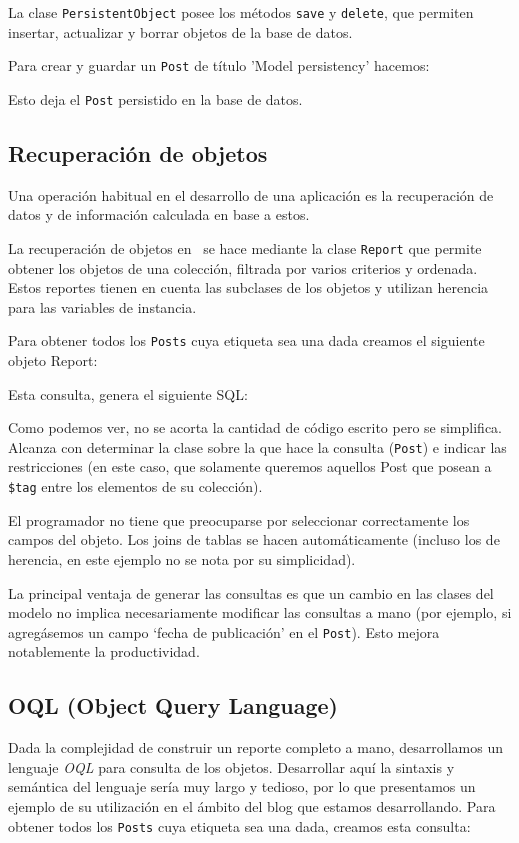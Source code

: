 La clase \verb'PersistentObject' posee los métodos \verb'save' y \verb'delete', que permiten insertar, actualizar y borrar objetos de la base de datos.

Para crear y guardar un \verb'Post' de título 'Model persistency' hacemos:


Esto deja el \verb'Post' persistido en la base de datos.

\subsection{Recuperación de objetos}

Una operación habitual en el desarrollo de una aplicación es la recuperación de datos y de información calculada en base a estos.

La recuperación de objetos en \PWB \ se hace mediante la clase \verb"Report" que permite obtener los objetos de una colección, filtrada por varios criterios y ordenada. Estos reportes tienen en cuenta las subclases de los objetos y utilizan herencia para las variables de instancia.

Para obtener todos los \verb"Posts" cuya etiqueta sea una dada creamos el siguiente objeto Report:


Esta consulta, genera el siguiente SQL:


Como podemos ver, no se acorta la cantidad de código escrito pero se simplifica. Alcanza con determinar la clase sobre la que hace la consulta (\verb"Post") e indicar las restricciones (en este caso, que solamente queremos aquellos Post que posean a \verb'$tag' entre los elementos de su colección). %

El programador no tiene que preocuparse por seleccionar correctamente los campos del objeto. Los joins de tablas se hacen automáticamente (incluso los de herencia, en este ejemplo no se nota por su simplicidad).

La principal ventaja de generar las consultas es que un cambio en las clases del modelo no implica necesariamente modificar las consultas a mano (por ejemplo, si agregásemos un campo `fecha de publicación' en el \verb"Post"). Esto mejora notablemente la productividad.

\subsection{OQL (Object Query Language)}
\label{sub-oql}
Dada la complejidad de construir un reporte completo a mano, desarrollamos un lenguaje \emph{OQL} para consulta de los objetos. Desarrollar aquí la sintaxis y semántica del lenguaje sería muy largo y tedioso, por lo que presentamos un ejemplo de su utilización en el ámbito del blog que estamos desarrollando. Para obtener todos los \verb"Posts" cuya etiqueta sea una dada, creamos esta consulta:

